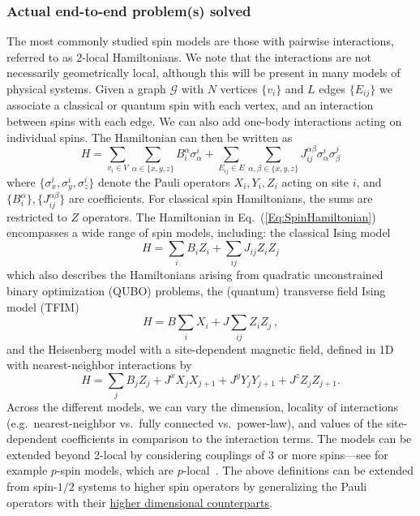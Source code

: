 \begin{refsection}
\subsubsection*{Actual end-to-end problem(s) solved}
The most commonly studied spin models are those with pairwise interactions, referred to as $2$-local Hamiltonians. We note that the interactions are not necessarily geometrically local, although this will be present in many models of physical systems. Given a graph $\mathcal{G}$ with $N$ vertices $\{v_i\}$ and $L$ edges $\{E_{ij}\}$ we associate a classical or quantum spin with each vertex, and an interaction between spins with each edge. We can also add one-body interactions acting on individual spins. The Hamiltonian can then be written as
\begin{equation}\label{Eq:SpinHamiltonian}
    H = \sum_{v_i\in V} \sum_{\alpha \in \{x,y,z\}} B_i^\alpha \sigma_\alpha^i + \sum_{E_{ij} \in E} \sum_{\alpha, \beta \in \{x,y,z\}} J_{ij}^{\alpha \beta} \sigma_\alpha^i \sigma_\beta^j
\end{equation}
where $\{\sigma_x^i,\sigma_y^i,\sigma_z^i\}$ denote the Pauli operators $X_i,Y_i,Z_i$ acting on site $i$, and $\{B_i^\alpha\}, \{J_{ij}^{\alpha \beta}\}$ are coefficients. For classical spin Hamiltonians, the sums are restricted to $Z$ operators. The Hamiltonian in Eq.~(\ref{Eq:SpinHamiltonian}) encompasses a wide range of spin models, including: the classical Ising model
\begin{equation}
    H = \sum_i B_i Z_i + \sum_{ij} J_{ij} Z_i Z_j
\end{equation}
which also describes the Hamiltonians arising from quadratic unconstrained binary optimization (QUBO) problems, the (quantum) transverse field Ising model (TFIM)
\begin{equation}
    H = B \sum_i X_i + J \sum_{ij} Z_i Z_j\,,
\end{equation}
and the Heisenberg model with a site-dependent magnetic field, defined in 1D with nearest-neighbor interactions by
\begin{equation}
    H = \sum_j B_j Z_j + J^x X_j X_{j+1} + J^y Y_j Y_{j+1} + J^z Z_j Z_{j+1}.
\end{equation}
Across the different models, we can vary the dimension, locality of interactions (e.g.~nearest-neighbor vs.~fully connected vs.~power-law), and values of the site-dependent coefficients in comparison to the interaction terms.
The models can be extended beyond 2-local by considering couplings of 3 or more spins---see for example $p$-spin models, which are $p$-local~\cite{derrida1980randomEnergyModel}. The above definitions can be extended from spin-$1/2$ systems to higher spin operators by generalizing the Pauli operators with their \href{https://en.wikipedia.org/wiki/Spin_(physics)\#Higher_spins}{higher dimensional counterparts}.




\end{refsection}

